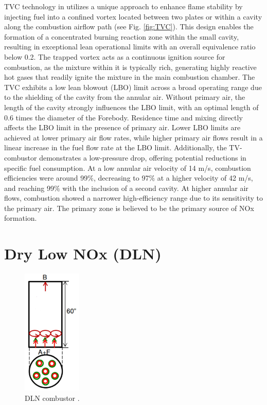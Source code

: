 TVC technology in \cite{TVC5266} utilizes a unique approach to enhance flame stability by injecting fuel into a confined vortex located between two plates or within a cavity along the combustion airflow path (see Fig. \ref{fig:TVC}). This design enables the formation of a concentrated burning reaction zone within the small cavity, resulting in exceptional lean operational limits with an overall equivalence ratio below 0.2. 
The trapped vortex acts as a continuous ignition source for combustion, as the mixture within it is typically rich, generating highly reactive hot gases that readily ignite the mixture in the main combustion chamber.
The TVC exhibits a low lean blowout (LBO) limit across a broad operating range due to the shielding of the cavity from the annular air. Without primary air, the length of the cavity strongly influences the LBO limit, with an optimal length of 0.6 times the diameter of the Forebody. Residence time and mixing directly affects the LBO limit in the presence of primary air.
Lower LBO limits are achieved at lower primary air flow rates, while higher primary air flows result in a linear increase in the fuel flow rate at the LBO limit. Additionally, the TV-combustor demonstrates a low-pressure drop, offering potential reductions in specific fuel consumption. At a low annular air velocity of 14 m/s, combustion efficiencies were around 99$\%$, decreasing to 97$\%$ at a higher velocity of 42 m/s, and reaching 99$\%$ with the inclusion of a second cavity. At higher annular air flows, combustion showed a narrower high-efficiency range due to its sensitivity to the primary air. The primary zone is believed to be the primary source of NOx formation.

\newpage
\section{Dry Low NOx (DLN)}
\vspace{-5mm}
\begin{figure}
\vspace{-12mm}
    \centering    \includegraphics[width=0.25\textwidth]{Chapter2/Images/DLN.jpeg}
    \caption[DLN combustor]{DLN combustor \cite{SKG2017}.}
    \label{fig:DLN}
\end{figure}

